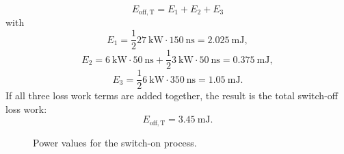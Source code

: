 \begin{solutionblock}
\begin{equation}
E_{\mathrm{off,T}} = E_{\mathrm{1}} + E_{\mathrm{2}} + E_{\mathrm{3}}
\end{equation}
with
\begin{equation}
E_{\mathrm{1}} = \frac{1}{2} \SI{27}{\kilo\watt} \cdot \SI{150}{\ns} = \SI {2.025}{\milli\joule},
\end{equation}
\begin{equation}
E_{\mathrm{2}} = \SI{6}{\kilo\watt} \cdot \SI{50}{\ns} + \frac{1}{2} \SI{3}{\kilo\watt} \cdot \SI{50}{\ns} = \SI {0.375}{\milli\joule},
\end{equation}
\begin{equation}
    E_{\mathrm{3}} = \frac{1}{2} \SI{6}{\kilo\watt} \cdot \SI{350}{\ns} = \SI {1.05}{\milli\joule}.
    \end{equation}
If all three loss work terms are added together, the result is the total switch-off loss work:
\begin{equation}
    E_{\mathrm{off,T}} =  \SI {3.45}{\milli\joule}.
\end{equation}
\begin{solutionfigure}[ht]
    \centering
    \begin{subfigure}[t]{0.45\textwidth}
        \centering
        \caption{Power values for the switch-on process.}
        \label{fig:Power values for the switch-on process}
    \end{subfigure}
    \hfill %
    \begin{subfigure}[t]{0.45\textwidth}
        \centering
        \begin{tikzpicture}

\end{tikzpicture}
\end{subfigure}
\end{solutionfigure}
\end{solutionblock}
